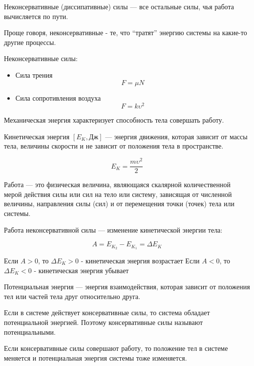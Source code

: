 \begin{definition}
    Неконсервативные (диссипативные) силы — все остальные силы, чья работа вычисляется по пути.

    Проще говоря, неконсервативные - те, что “тратят” энергию системы на какие-то другие процессы.
\end{definition}

Неконсервативные силы:
\begin{itemize}
    \item Сила трения
        $$F=\mu N$$
    \item Сила сопротивления воздуха
        $$F=k\upsilon^2$$
\end{itemize}

\begin{definition}
    Механическая энергия характеризует способность тела совершать работу.

    Кинетическая энергия $[E_K, Дж]$ — энергия движения, которая зависит от массы тела, величины скорости и не зависит от положения тела в пространстве.
\end{definition}

$$E_K=\frac{m\upsilon^2}{2}$$

\begin{definition}
    Работа — это физическая величина, являющаяся скалярной количественной мерой действия 
    силы или сил на тело или систему, зависящая от численной величины, направления силы (сил) и от перемещения точки (точек) тела или системы. 
\end{definition}

\begin{definition}
    Работа неконсервативной силы — изменение кинетической энергии тела:

    $$A=E_{K_2}-E_{K_1}=\Delta E_K$$
\end{definition}

Если $A>0$, то $\Delta E_K>0$ - кинетическая энергия возрастает
Если $A<0$, то $\Delta E_K<0$ - кинетическая энергия убывает

\begin{definition}
    Потенциальная энергия — энергия взаимодействия, которая зависит от положения тел или частей тела друг относительно друга.

    Если в системе действует консервативные силы, то система обладает потенциальной энергией. Поэтому консервативные силы называют потенциальными.

    Если консервативные силы совершают работу, то положение тел в системе меняется и потенциальная энергия системы тоже изменяется.
\end{definition}

